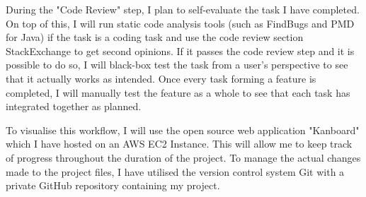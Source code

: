 \documentclass[]{report}
\begin{document}
	During the "Code Review" step, I plan to self-evaluate the task I have completed. On top of this, I will run static code analysis tools (such as FindBugs and PMD for Java) if the task is a coding task and use the code review section StackExchange to get second opinions. If it passes the code review step and it is possible to do so, I will black-box test the task from a user's perspective to see that it actually works as intended. Once every task forming a feature is completed, I will manually test the feature as a whole to see that each task has integrated together as planned.
		
	To visualise this workflow, I will use the open source web application "Kanboard" which I have hosted on an AWS EC2 Instance. This will allow me to keep track of progress throughout the duration of the project. To manage the actual changes made to the project files, I have utilised the version control system Git with a private GitHub repository containing my project.
		
\end{document}
